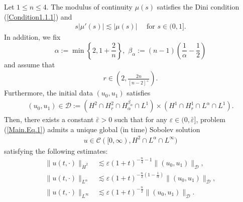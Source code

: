\documentclass[10pt,a4paper]{amsart}
\begin{document}
\begin{theorem}\label{Theorem1}
     Let $1 \leq n \leq 4$. The modulus of continuity $\mu(s) $ satisfies the Dini condition (\ref{Condition1.1.1})
     and
     \begin{align}\label{Condition1.1.2}
         s|\mu'(s)| \lesssim |\mu(s)|  \quad \text{ for } s \in (0, 1].
     \end{align}
    In addition, we fix $$\alpha := \min\left\{2, 1+\frac{2}{n}\right\}, \,\,\beta_\alpha := (n-1)\left(\frac{1}{\alpha}-\frac{1}{2}\right)$$ and assume that
    \begin{align*}
        r \in \left(2, \frac{2n}{[n-2]^+}\right).
    \end{align*}
    Furthermore, the initial data $(u_0, u_1)$ satisfies
    \begin{align*}
        (u_0, u_1) \in \mathcal{D} := \left(H^2 \cap H^{2}_r \cap H^{\beta_\alpha}_\alpha\cap L^1  \right)\times \left(H^1 \cap H^1_r \cap L^{\alpha} \cap L^1\right).
    \end{align*}
    Then, there exists a constant $\bar{\varepsilon} > 0$ such that for any $\varepsilon \in (0, \bar{\varepsilon}]$, problem (\ref{Main.Eq.1}) admits a unique global (in time) Sobolev solution
    \begin{align*}
        u \in \mathcal{C}([0, \infty), H^2 \cap L^\alpha \cap L^\infty)
    \end{align*}
    satisfying the following estimates:
    \begin{align*}
        \|u(t,\cdot)\|_{\dot{H}^2} &\lesssim \varepsilon(1+t)^{-\frac{n}{4}-1} \|(u_0,u_1)\|_{\mathcal{D}},\\
        \|u(t,\cdot)\|_{L^{\alpha}} &\lesssim \varepsilon(1+t)^{-\frac{n}{2}(1-\frac{1}{\alpha})} \|(u_0,u_1)\|_{\mathcal{D}},\\
        \|u(t,\cdot)\|_{L^\infty} &\lesssim \varepsilon(1+t)^{-\frac{n}{2}}  \|(u_0,u_1)\|_{\mathcal{D}}.
    \end{align*}
\end{theorem}
\end{document}
